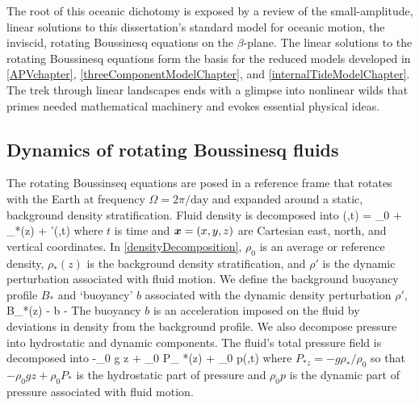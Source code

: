 \documentclass[12pt, oneside]{book}
\begin{document}
The root of this oceanic dichotomy is exposed by a review of the small-amplitude, linear solutions to this dissertation's standard model for oceanic motion, the inviscid, rotating Boussinesq equations on the $\beta$-plane.  The linear solutions to the rotating Boussinesq equations form the basis for the reduced models developed in \ref{APVchapter}, \ref{threeComponentModelChapter}, and \ref{internalTideModelChapter}.  The trek through linear landscapes ends with a glimpse into nonlinear wilds that primes needed mathematical machinery and evokes essential physical ideas.

\subsection{Dynamics of rotating Boussinesq fluids}

The rotating Boussinseq equations are posed in a reference frame that rotates with the Earth at frequency $\Omega = 2 \pi / \text{day}$ and expanded around a static, background density stratification.  Fluid density is decomposed into
\beq
\rho(\bx,t) = \rho_0 + \rho_*(z) + \rho'(\bx,t) \com 
\label{densityDecomposition}
\eeq 
where $t$ is time and $\boldsymbol x = (x,y,z)$ are Cartesian east, north, and vertical coordinates.  In \eqref{densityDecomposition}, $\rho_0$ is an average or reference density, $\rho_*(z)$ is the background density stratification, and $\rho'$ is the dynamic perturbation associated with fluid motion.  We define the background buoyancy profile $B_*$ and `buoyancy' $b$ associated with the dynamic density perturbation $\rho'$,
\beq
B_*(z)  -  \qquad {} \qquad b  -  \per
\label{buoyancyDef}
\eeq
The buoyancy $b$ is an acceleration imposed on the fluid by deviations in density from the background profile.  We also decompose pressure into hydrostatic and dynamic components.  The fluid's total pressure field is decomposed into
\beq
-\rho_0 g z + \rho_0 P_{\! *}(z) + \rho_0 p(\bx,t) \com 
\eeq
where $P_{*z} = -g \rho_{*} / \rho_0$ so that $-\rho_0 g z + \rho_0 P_{\! *}$ is the hydrostatic part of pressure and $\rho_0 p$ is the dynamic part of pressure associated with fluid motion.
\end{document}
